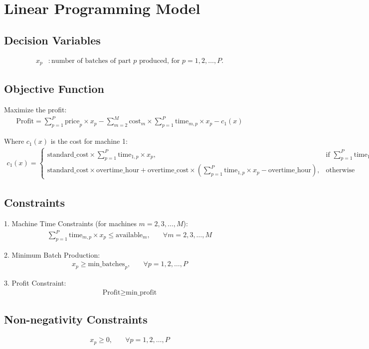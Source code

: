 \documentclass{article}
\begin{document}
\section*{Linear Programming Model}

\subsection*{Decision Variables}
\begin{align*}
x_p & : \text{number of batches of part } p \text{ produced, for } p = 1, 2, \ldots, P.
\end{align*}

\subsection*{Objective Function}
Maximize the profit:
\begin{align*}
\text{Profit} = \sum_{p=1}^{P} \text{price}_p \times x_p - \sum_{m=2}^{M} \text{cost}_m \times \sum_{p=1}^{P} \text{time}_{m,p} \times x_p - c_1(x)
\end{align*}

Where \(c_1(x)\) is the cost for machine 1:
\begin{align*}
c_1(x) = 
\begin{cases} 
\text{standard\_cost} \times \sum_{p=1}^{P} \text{time}_{1,p} \times x_p, & \text{if } \sum_{p=1}^{P} \text{time}_{1,p} \times x_p \leq \text{overtime\_hour} \\
\text{standard\_cost} \times \text{overtime\_hour} + \text{overtime\_cost} \times \left(\sum_{p=1}^{P} \text{time}_{1,p} \times x_p - \text{overtime\_hour}\right), & \text{otherwise} 
\end{cases}
\end{align*}

\subsection*{Constraints}
1. Machine Time Constraints (for machines \(m = 2, 3, \ldots, M\)):
\begin{align*}
\sum_{p=1}^{P} \text{time}_{m,p} \times x_p \leq \text{available}_m, & \quad \forall m = 2, 3, \ldots, M
\end{align*}

2. Minimum Batch Production:
\begin{align*}
x_p \geq \text{min\_batches}_p, & \quad \forall p = 1, 2, \ldots, P
\end{align*}

3. Profit Constraint:
\begin{align*}
\text{Profit} \geq \text{min\_profit}
\end{align*}

\subsection*{Non-negativity Constraints}
\begin{align*}
x_p \geq 0, & \quad \forall p = 1, 2, \ldots, P
\end{align*}
\end{document}
